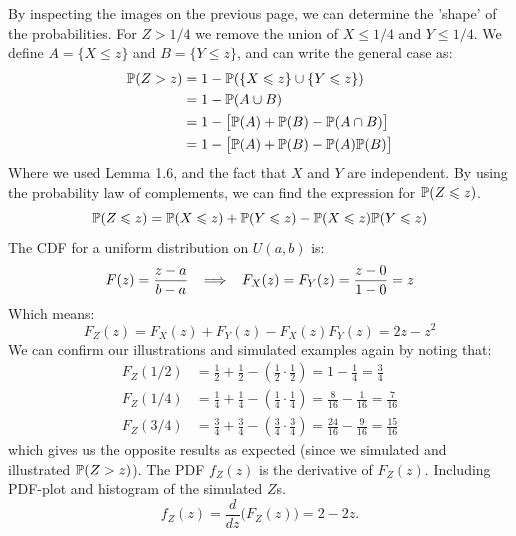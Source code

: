 \newpage\noindent
By inspecting the images on the previous page, we can determine the 'shape' of the probabilities.
For $Z > 1/4$ we remove the union of $X \leq 1/4$ and $Y\leq 1/4$. We define $A = \{X \leq z\}$ and
$B = \{Y\leq z\}$, and can write the general case as:
\begin{align*}
    \P(Z > z) &=
    1 - \P(\{X \leq z\}\cup \{Y \leq z\}) \\
    &= 1 - \P(A\cup B) \\
    &= 1 - \big[\P(A) + \P(B) - \P(A\cap B)\big] \\
    &= 1 - \big[\P(A) + \P(B) - \P(A)\P(B)\big]
\end{align*}
Where we used Lemma 1.6, and the fact that $X$ and $Y$ are independent. By using the probability
law of complements, we can find the expression for $\P(Z\leq z)$.
$$
\P(Z\leq z) = \P(X\leq z) + \P(Y\leq z) - \P(X\leq z)\P(Y\leq z)
$$
The CDF for a uniform distribution on $U(a,b)$ is:
$$
F(z) = \frac{z-a}{b-a} \imp F_X(z) = F_Y(z) = \frac{z-0}{1-0} = z
$$
Which means:
$$
F_Z(z) = F_X(z) + F_Y(z) - F_X(z)F_Y(z) = 2z - z^2
$$
We can confirm our illustrations and simulated examples again by noting that:
\begin{align*}
    F_Z(1/2) &= \frac{1}{2} + \frac{1}{2} - \left(\frac{1}{2}\cdot\frac{1}{2}\right) = 1 - \frac{1}{4} = \frac{3}{4} \\
    F_Z(1/4) &= \frac{1}{4} + \frac{1}{4} - \left(\frac{1}{4}\cdot\frac{1}{4}\right) = \frac{8}{16} - \frac{1}{16} = \frac{7}{16}\\
    F_Z(3/4) &= \frac{3}{4} + \frac{3}{4} - \left(\frac{3}{4}\cdot\frac{3}{4}\right) = \frac{24}{16} - \frac{9}{16} = \frac{15}{16}
\end{align*}
which gives us the opposite results as expected (since we simulated and illustrated $\P(Z > z)$).
The PDF $f_Z(z)$ is the derivative of $F_Z(z)$.
Including PDF-plot and histogram of the simulated $Z$s.
$$
f_Z(z) = \frac{d}{dz}\Big(F_Z(z)\Big) = 2 - 2z.
$$
